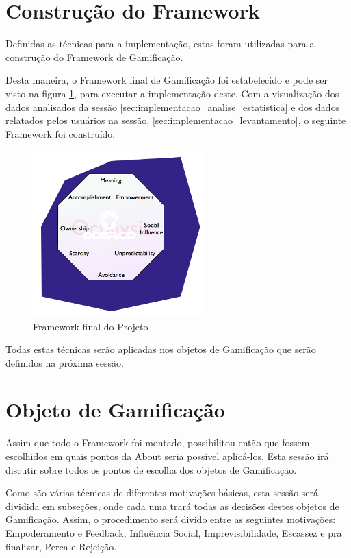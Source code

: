 \section{Construção do Framework}
\label{sec:gamifição}
Definidas as técnicas para a implementação, estas foram utilizadas para a construção do Framework
de Gamificação.

Desta maneira, o Framework final de Gamificação foi estabelecido e pode ser visto
na figura \ref{fig:final_project_octalisys}, para executar a implementação
deste. Com a visualização dos dados analisados da sessão \ref{sec:implementacao_analise_estatistica}
e dos dados relatados pelos usuários na sessão, \ref{sec:implementacao_levantamento}, o seguinte Framework
foi construído:

\begin{figure}[h]
    \centering

    \includegraphics[width=250px, scale=1]{figuras/final_framework}
    \caption{Framework final do Projeto}

    \label{fig:final_project_octalisys}
\end{figure}

Todas estas técnicas serão aplicadas nos objetos de Gamificação que  serão definidos na próxima sessão.

\section{Objeto de Gamificação}
\label{sec:gamifição}
Assim que todo o Framework foi montado, possibilitou então que fossem escolhidos em quais
pontos da About seria possível aplicá-los. Esta sessão irá discutir sobre todos os pontos de escolha
dos objetos de Gamificação.

Como são várias técnicas de diferentes motivações básicas, esta sessão será dividida em subseções, onde
cada uma trará todas as decisões destes objetos de Gamificação. Assim, o procedimento será divido entre
as seguintes motivações: Empoderamento e Feedback, Influência Social, Imprevisibilidade,
Escassez e pra finalizar,  Perca e Rejeição.

